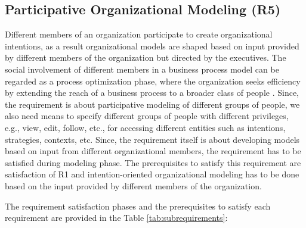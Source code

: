 \subsection{Participative Organizational Modeling (R5)}
 Different members of an organization participate to create organizational intentions, as a result organizational models are shaped based on input provided by different members of the organization but directed by the executives. The social involvement of different members in a business process model can be regarded as a process optimization phase, where the organization seeks efficiency by extending the reach of a business process to a broader class of people \cite{Brambilla2012}. Since, the requirement is about participative modeling of different groups of people, we also need means to specify different groups of people with different privileges, e.g., view, edit, follow, etc., for accessing different entities such as intentions, strategies, contexts, etc. Since, the requirement itself is about developing models based on input from different organizational members, the requirement has to be satisfied during modeling phase. The prerequisites to satisfy this requirement are satisfaction of R1 and intention-oriented organizational modeling has to be done based on the input provided by different members of the organization.  
 
 The requirement satisfaction phases and the prerequisites to satisfy each requirement are provided in the Table \ref{tab:subrequirements}:

